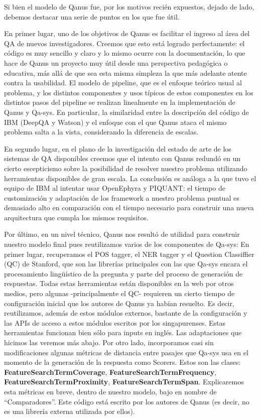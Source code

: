 \bigskip

Si bien el modelo de Qanus fue, por los motivos recién expuestos,
dejado de lado, debemos destacar una serie de puntos en los que fue
útil.

En primer lugar, uno de los objetivos de Qanus es facilitar el ingreso
al área del QA de nuevos investigadores. Creemos que esto está
logrado perfectamente: el código es muy sencillo y claro y lo mismo
ocurre con la documentación, lo que hace de Qanus un proyecto muy
útil desde una perspectiva pedagógica o educativa, más allá de
que sea esta misma simpleza la que más adelante atente contra la
usabilidad. El modelo de pipeline, que es el enfoque teórico usual al
problema, y los distintos componentes y usos típicos de estos
componentes en los distintos pasos del pipeline se realizan linealmente
en la implementación de Qanus y Qa-sys. En particular, la similaridad
entre la descripción del código de IBM (DeepQA y Watson) y el
enfoque con el que Qanus ataca el mismo problema salta a la vista,
considerando la diferencia de escalas. 

En segundo lugar, en el plano de la investigación del estado de arte
de los sistemas de QA disponibles creemos que el intento con Qanus
redundó en un cierto escepticismo sobre la posibilidad de resolver
nuestro problema utilizando herramientas disponibles de gran escala. La
conclusión es análoga a la que tuvo el equipo de IBM al intentar
usar OpenEphyra y PIQUANT: el tiempo de customización y adaptación
de los framework a nuestro problema puntual es demasiado alto en
comparación con el tiempo necesario para construir una nueva
arquitectura que cumpla los mismos requisitos. 

Por último, en un nivel técnico, Qanus nos resultó de utilidad para
construir nuestro modelo final pues reutilizamos varios de los
componentes de Qa-sys: En primer lugar, recuperamos el POS tagger, el
NER tagger y el Question Classiffier (QC) de Stanford, que son las
librerías principales con las que Qa-sys encara el procesamiento
lingüístico de la pregunta y parte del proceso de generación de
respuestas. Todas estas herramientas están disponibles en la web por
otros medios, pero algunas -principalmente el QC- requieren un cierto
tiempo de configuración inicial que los autores de Qanus ya habían
resuelto. Es decir, reutilizamos, además de estos módulos externos,
bastante de la configuración y las APIs de acceso a estos módulos
escritos por los singapurenses. Estas herramientas funcionan bien
sólo para inputs en inglés. Las adaptaciones que hicimos las
veremos más abajo. Por otro lado, incorporamos casi sin
modificaciones algunas métricas de distancia entre pasajes que Qa-sys
usa en el momento de la generación de la respuesta como Scorers.
Estos son las clases: \textbf{FeatureSearchTermCoverage},
\textbf{FeatureSearchTermFrequency}, \textbf{FeatureSearchTermProximity},
\textbf{FeatureSearchTermSpan}. Explicaremos esta métricas en breve, dentro de nuestro
modelo, bajo en nombre de
{\textquotedblleft}Comparadores{\textquotedblright}. Este código
está escrito por los autores de Qanus (es decir, no es una librería externa utilizada por ellos).


